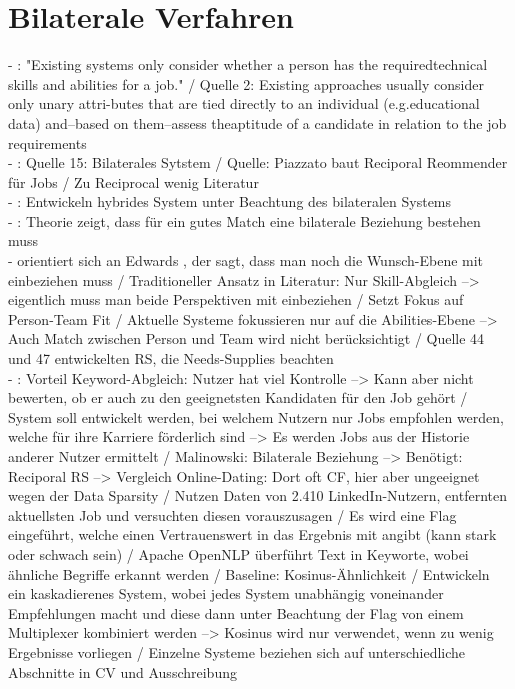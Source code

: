 \section{Bilaterale Verfahren}
\label{ch:standDerForschung:bilateraleVerfahren}
- \cite{malinowski:2008}: "Existing systems only consider whether a person has the requiredtechnical skills and abilities for a job." / Quelle 2: Existing approaches usually consider only unary attri-butes that are tied directly to an individual (e.g.educational data) and–based on them–assess theaptitude of a candidate in relation to the job requirements\\
- \cite{jobRecommenderSystemsASurvey:2012}: Quelle 15: Bilaterales Sytstem / Quelle: Piazzato baut Reciporal Reommender für Jobs / Zu Reciprocal wenig Literatur\\
- \cite{hybridImmunizing:2017}: Entwickeln hybrides System unter Beachtung des bilateralen Systems \\
- \cite{malinowski:2006}: Theorie zeigt, dass für ein gutes Match eine bilaterale Beziehung bestehen muss\\
- \cite{malinowski:2008} orientiert sich an Edwards \cite{edwards:1991}, der sagt, dass man noch die Wunsch-Ebene mit einbeziehen muss / Traditioneller Ansatz in Literatur: Nur Skill-Abgleich --> eigentlich muss man beide Perspektiven mit einbeziehen / Setzt Fokus auf Person-Team Fit / Aktuelle Systeme fokussieren nur auf die Abilities-Ebene --> Auch Match zwischen Person und Team wird nicht berücksichtigt / Quelle 44 und 47 entwickelten RS, die Needs-Supplies beachten \\
- \cite{comibingCareer:2013}: Vorteil Keyword-Abgleich: Nutzer hat viel Kontrolle --> Kann aber nicht bewerten, ob er auch zu den geeignetsten Kandidaten für den Job gehört / System soll entwickelt werden, bei welchem Nutzern nur Jobs empfohlen werden, welche für ihre Karriere förderlich sind --> Es werden Jobs aus der Historie anderer Nutzer ermittelt / Malinowski: Bilaterale Beziehung --> Benötigt: Reciporal RS --> Vergleich Online-Dating: Dort oft CF, hier aber ungeeignet wegen der Data Sparsity / Nutzen Daten von 2.410 LinkedIn-Nutzern, entfernten aktuellsten Job und versuchten diesen vorauszusagen / Es wird eine Flag eingeführt, welche einen Vertrauenswert in das Ergebnis mit angibt (kann stark oder schwach sein) / Apache OpenNLP überführt Text in Keyworte, wobei ähnliche Begriffe erkannt werden / Baseline: Kosinus-Ähnlichkeit / Entwickeln ein kaskadierenes System, wobei jedes System unabhängig voneinander Empfehlungen macht und diese dann unter Beachtung der Flag von einem Multiplexer kombiniert werden --> Kosinus wird nur verwendet, wenn zu wenig Ergebnisse vorliegen / Einzelne Systeme beziehen sich auf unterschiedliche Abschnitte in CV und Ausschreibung \\
